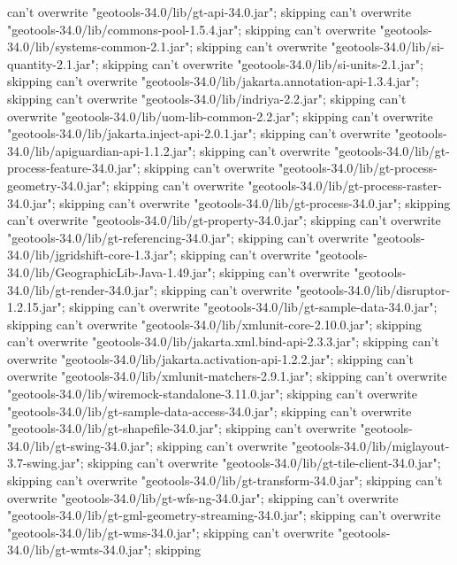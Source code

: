     can't overwrite "geotools-34.0/lib/gt-api-34.0.jar"; skipping
    can't overwrite "geotools-34.0/lib/commons-pool-1.5.4.jar"; skipping
    can't overwrite "geotools-34.0/lib/systems-common-2.1.jar"; skipping
    can't overwrite "geotools-34.0/lib/si-quantity-2.1.jar"; skipping
    can't overwrite "geotools-34.0/lib/si-units-2.1.jar"; skipping
    can't overwrite "geotools-34.0/lib/jakarta.annotation-api-1.3.4.jar"; skipping
    can't overwrite "geotools-34.0/lib/indriya-2.2.jar"; skipping
    can't overwrite "geotools-34.0/lib/uom-lib-common-2.2.jar"; skipping
    can't overwrite "geotools-34.0/lib/jakarta.inject-api-2.0.1.jar"; skipping
    can't overwrite "geotools-34.0/lib/apiguardian-api-1.1.2.jar"; skipping
    can't overwrite "geotools-34.0/lib/gt-process-feature-34.0.jar"; skipping
    can't overwrite "geotools-34.0/lib/gt-process-geometry-34.0.jar"; skipping
    can't overwrite "geotools-34.0/lib/gt-process-raster-34.0.jar"; skipping
    can't overwrite "geotools-34.0/lib/gt-process-34.0.jar"; skipping
    can't overwrite "geotools-34.0/lib/gt-property-34.0.jar"; skipping
    can't overwrite "geotools-34.0/lib/gt-referencing-34.0.jar"; skipping
    can't overwrite "geotools-34.0/lib/jgridshift-core-1.3.jar"; skipping
    can't overwrite "geotools-34.0/lib/GeographicLib-Java-1.49.jar"; skipping
    can't overwrite "geotools-34.0/lib/gt-render-34.0.jar"; skipping
    can't overwrite "geotools-34.0/lib/disruptor-1.2.15.jar"; skipping
    can't overwrite "geotools-34.0/lib/gt-sample-data-34.0.jar"; skipping
    can't overwrite "geotools-34.0/lib/xmlunit-core-2.10.0.jar"; skipping
    can't overwrite "geotools-34.0/lib/jakarta.xml.bind-api-2.3.3.jar"; skipping
    can't overwrite "geotools-34.0/lib/jakarta.activation-api-1.2.2.jar"; skipping
    can't overwrite "geotools-34.0/lib/xmlunit-matchers-2.9.1.jar"; skipping
    can't overwrite "geotools-34.0/lib/wiremock-standalone-3.11.0.jar"; skipping
    can't overwrite "geotools-34.0/lib/gt-sample-data-access-34.0.jar"; skipping
    can't overwrite "geotools-34.0/lib/gt-shapefile-34.0.jar"; skipping
    can't overwrite "geotools-34.0/lib/gt-swing-34.0.jar"; skipping
    can't overwrite "geotools-34.0/lib/miglayout-3.7-swing.jar"; skipping
    can't overwrite "geotools-34.0/lib/gt-tile-client-34.0.jar"; skipping
    can't overwrite "geotools-34.0/lib/gt-transform-34.0.jar"; skipping
    can't overwrite "geotools-34.0/lib/gt-wfs-ng-34.0.jar"; skipping
    can't overwrite "geotools-34.0/lib/gt-gml-geometry-streaming-34.0.jar"; skipping
    can't overwrite "geotools-34.0/lib/gt-wms-34.0.jar"; skipping
    can't overwrite "geotools-34.0/lib/gt-wmts-34.0.jar"; skipping
